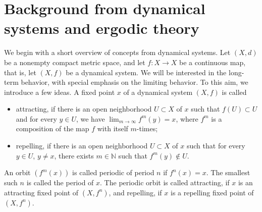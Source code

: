 \documentclass[format=acmsmall, authorversion, screen=true]{acmart}
\begin{document}


\section{Background from dynamical systems and ergodic theory}
\label{sec:prelim}
We begin with a short overview of concepts from dynamical systems. 
Let $(X,d)$ be a nonempty compact metric space, and 
let $f\colon X\to X$ be a continuous map, that is, let $(X,f)$ be a dynamical system. 
We will be interested in the long-term behavior, with special emphasis on the limiting behavior. To this aim, we introduce a few ideas. 
A fixed point $x$ of a dynamical system $(X,f)$ is called
\begin{itemize}
    \item attracting, if there is an open neighborhood $U\subset X$ of $x$ such that $f(U)\subset U$ and for every $y\in U$, we have $\lim_{m\to\infty}f^m(y)=x$, where $f^m$ is a composition of the map $f$ with itself $m$-times;
    \item repelling, if there is an open neighborhood $U\subset X$ of $x$ such that for every $y\in U$, $y\neq x$, there exists $m\in\mathbb{N}$ such that $f^m(y)\notin U$.
\end{itemize}
An orbit $(f^m(x))$ is called periodic of period $n$ if $f^n(x)=x$. The smallest such $n$ is called the period of $x$. The periodic orbit is called attracting, if $x$ is an attracting fixed point of $(X,f^n)$, and repelling, if $x$ is a repelling fixed point of $(X,f^n)$.
\end{document}
